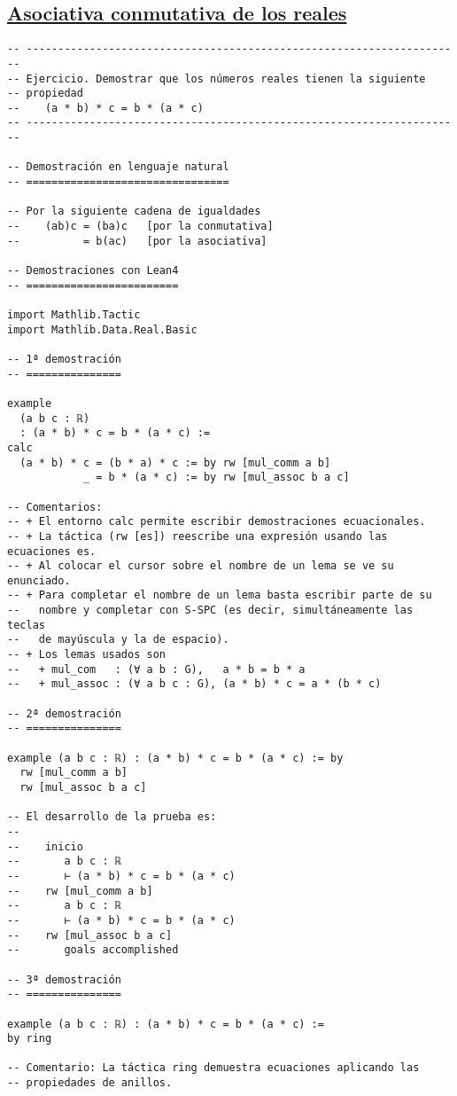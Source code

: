 \subsection{\href{./src/Basicos/Asociativa\_conmutativa\_de\_los\_reales.lean}{Asociativa conmutativa de los reales}}
\label{sec:orgd1b0479}
\begin{verbatim}
-- ---------------------------------------------------------------------
-- Ejercicio. Demostrar que los números reales tienen la siguiente
-- propiedad
--    (a * b) * c = b * (a * c)
-- ---------------------------------------------------------------------

-- Demostración en lenguaje natural
-- ================================

-- Por la siguiente cadena de igualdades
--    (ab)c = (ba)c   [por la conmutativa]
--          = b(ac)   [por la asociativa]

-- Demostraciones con Lean4
-- ========================

import Mathlib.Tactic
import Mathlib.Data.Real.Basic

-- 1ª demostración
-- ===============

example
  (a b c : ℝ)
  : (a * b) * c = b * (a * c) :=
calc
  (a * b) * c = (b * a) * c := by rw [mul_comm a b]
            _ = b * (a * c) := by rw [mul_assoc b a c]

-- Comentarios:
-- + El entorno calc permite escribir demostraciones ecuacionales.
-- + La táctica (rw [es]) reescribe una expresión usando las ecuaciones es.
-- + Al colocar el cursor sobre el nombre de un lema se ve su enunciado.
-- + Para completar el nombre de un lema basta escribir parte de su
--   nombre y completar con S-SPC (es decir, simultáneamente las teclas
--   de mayúscula y la de espacio).
-- + Los lemas usados son
--   + mul_com   : (∀ a b : G),   a * b = b * a
--   + mul_assoc : (∀ a b c : G), (a * b) * c = a * (b * c)

-- 2ª demostración
-- ===============

example (a b c : ℝ) : (a * b) * c = b * (a * c) := by
  rw [mul_comm a b]
  rw [mul_assoc b a c]

-- El desarrollo de la prueba es:
--
--    inicio
--       a b c : ℝ
--       ⊢ (a * b) * c = b * (a * c)
--    rw [mul_comm a b]
--       a b c : ℝ
--       ⊢ (a * b) * c = b * (a * c)
--    rw [mul_assoc b a c]
--       goals accomplished

-- 3ª demostración
-- ===============

example (a b c : ℝ) : (a * b) * c = b * (a * c) :=
by ring

-- Comentario: La táctica ring demuestra ecuaciones aplicando las
-- propiedades de anillos.
\end{verbatim}

